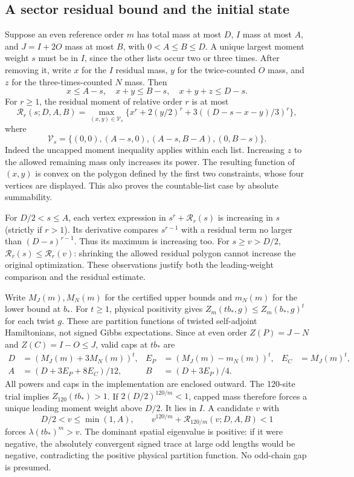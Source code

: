 \documentclass[11pt,a4paper]{article}
\begin{document}
\subsection{A sector residual bound and the initial state}
Suppose an even reference order $m$ has total mass at most $D$,
$I$ mass at most $A$, and $J=I+2O$ mass at most $B$, with
$0<A\le B\le D$. A unique largest moment weight $s$ must be in $I$,
since the other lists occur two or three times. After removing it,
write $x$ for the $I$ residual mass, $y$ for the twice-counted $O$ mass,
and $z$ for the three-times-counted $N$ mass. Then
\[
 x\le A-s,\quad x+y\le B-s,\quad x+y+z\le D-s.
\]
For $r\ge1$, the residual moment of relative order $r$ is at most
\begin{equation}\label{eq:sector-R}
 \mathcal R_r(s;D,A,B)=
 \max_{(x,y)\in\mathcal V_s}
 \{x^r+2(y/2)^r+3((D-s-x-y)/3)^r\},
\end{equation}
where
\[
 \mathcal V_s=\{(0,0),(A-s,0),(A-s,B-A),(0,B-s)\}.
\]
Indeed the uncapped moment inequality applies within each list.
Increasing $z$ to the allowed remaining mass only increases its power.
The resulting function of $(x,y)$ is convex on the polygon defined by
the first two constraints, whose four vertices are displayed.
This also proves the countable-list case by absolute summability.

For $D/2<s\le A$, each vertex expression in
$s^r+\mathcal R_r(s)$ is increasing in $s$ (strictly if $r>1$).
Its derivative compares $s^{r-1}$ with a residual term no larger than
$(D-s)^{r-1}$. Thus its maximum is increasing too. For $s\ge v>D/2$,
$\mathcal R_r(s)\le\mathcal R_r(v)$: shrinking the allowed residual
polygon cannot increase the original optimization. These observations
justify both the leading-weight comparison and the residual estimate.

Write $M_J(m),M_N(m)$ for the certified upper bounds and $m_N(m)$ for
the lower bound at $b_*$. For $t\ge1$, physical positivity gives
$Z_m(tb_*,g)\le Z_m(b_*,g)^t$ for each twist $g$.
These are partition functions of twisted self-adjoint Hamiltonians,
not signed Gibbs expectations. Since at even order
$Z(P)=J-N$ and $Z(C)=I-O\le J$, valid caps at $tb_*$ are
\begin{align*}
 D&=(M_J(m)+3M_N(m))^t,&
 E_P&=(M_J(m)-m_N(m))^t, &E_C&=M_J(m)^t,\\
 A&=(D+3E_P+8E_C)/12,& B&=(D+3E_P)/4.
\end{align*}
All powers and caps in the implementation are enclosed outward.
The 120-site trial implies $Z_{120}(tb_*)>1$.
If $2(D/2)^{120/m}<1$, capped mass therefore forces a unique leading
moment weight above $D/2$. It lies in $I$. A candidate $v$ with
\begin{equation}\label{eq:sector-v}
 D/2<v\le\min(1,A),\qquad
 v^{120/m}+\mathcal R_{120/m}(v;D,A,B)<1
\end{equation}
forces $\lambda(tb_*)^m>v$. The dominant spatial eigenvalue is positive:
if it were negative, the absolutely convergent signed trace at large
odd lengths would be negative, contradicting the positive physical
partition function. No odd-chain gap is presumed.
\end{document}
